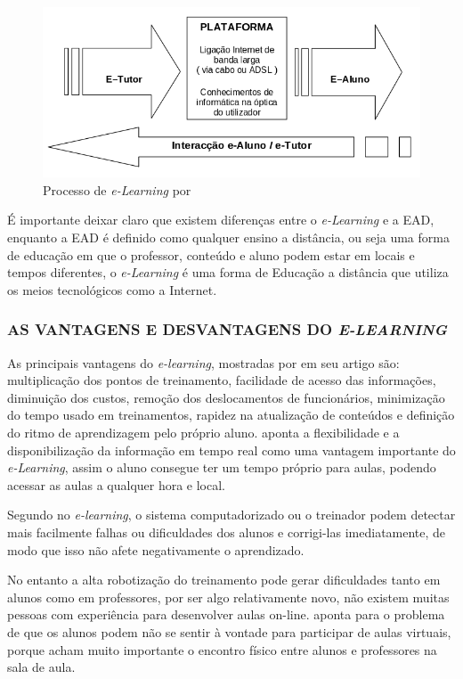 \begin{figure}[h]
  \centering
  \label{fig:e-learning-caracterização-barbosa}
  \includegraphics[keepaspectratio=true,scale=0.6]{figuras/e-learning-barbosa.png}
  \caption{Processo de \textit{e-Learning} por }
\end{figure}


É importante deixar claro que existem diferenças entre o \textit{e-Learning} e a EAD, enquanto a EAD é definido como qualquer ensino a distância, ou seja uma forma de educação em que o professor, conteúdo e aluno podem estar em locais e tempos diferentes, o \textit{e-Learning} é uma forma de Educação a distância que utiliza os meios tecnológicos como a Internet.


\subsubsection{AS VANTAGENS E DESVANTAGENS DO \textit{E-LEARNING}}
As principais vantagens do \textit{e-learning}, mostradas por  em seu artigo são: multiplicação dos pontos de treinamento, facilidade de acesso das informações, diminuição dos custos, remoção dos deslocamentos de funcionários, minimização do tempo usado em treinamentos, rapidez na atualização de conteúdos e definição do ritmo de aprendizagem pelo próprio aluno.
 aponta a flexibilidade e a disponibilização da informação em tempo real como uma vantagem importante do \textit{e-Learning}, assim o aluno consegue ter um tempo próprio para aulas, podendo acessar as aulas a qualquer hora e local.

Segundo \cite[p.~6]{bernardo} no \textit{e-learning}, o sistema computadorizado ou o treinador podem detectar mais facilmente falhas ou dificuldades dos alunos e corrigi-las imediatamente, de modo que isso não afete negativamente o aprendizado.

No entanto a alta robotização do treinamento pode gerar dificuldades tanto em alunos como em professores, por ser algo relativamente novo, não existem muitas pessoas com experiência para desenvolver aulas on-line. \cite[p.~6]{bernardo} aponta para o problema de que os alunos podem não se sentir à vontade para participar de aulas virtuais, porque acham muito importante o encontro físico entre alunos e professores na sala de aula.

